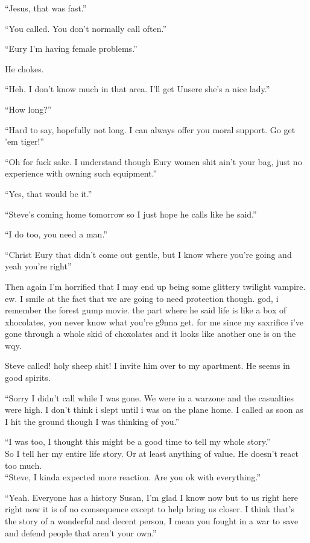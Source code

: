 ``Jesus, that was fast.''

``You called. You don't normally call often.''

``Eury I'm having female problems.''

He chokes.

``Heh. I don't know much in that area. I'll get Unsere she's a nice lady.''

``How long?''

``Hard to say, hopefully not long. I can always offer you moral support. Go get 'em tiger!''

``Oh for fuck sake. I understand though Eury women shit ain't your bag, just no experience with owning such equipment.''

``Yes, that would be it.''

``Steve's coming home tomorrow so I just hope he calls like he said.''

``I do too, you need a man.''

``Christ Eury that didn't come out gentle, but I know where you're going and yeah you're right''

Then again I'm horrified that I may end up being some glittery twilight vampire. ew.
I smile at the fact that we are going to need protection though. god, i remember the forest gump movie. the part where he said life is like a box of xhocolates, you never know what you're g9nna get. for me since my saxrifice i've gone through a whole skid of choxolates and it looks like another one is on the wqy.

Steve called! holy sheep shit! I invite him over to my apartment. He seems in good spirits.

``Sorry I didn't call while I was gone. We were in a warzone and the casualties were high. I don't think i slept until i was on the plane home. I called as soon as I hit the ground though I was thinking of you.''

``I was too, I thought this might be a good time to tell my whole story.''\\

So I tell her my entire life story. Or at least anything of value. He doesn't react too much.\\

``Steve, I kinda expected more reaction. Are you ok with everything.''

``Yeah. Everyone has a history Susan, I'm glad I know now but to us right here right now it is of no comsequence except to help bring us closer. I think that's the story of a wonderful and decent person, I mean you fought in a war to save and defend people that aren't your own.''

